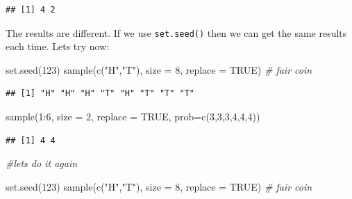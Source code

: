 \documentclass[
]{book}
\newenvironment{Shaded}{\begin{snugshade}}{\end{snugshade}}
\newcommand{\AttributeTok}[1]{\textcolor[rgb]{0.77,0.63,0.00}{#1}}
\newcommand{\CommentTok}[1]{\textcolor[rgb]{0.56,0.35,0.01}{\textit{#1}}}
\newcommand{\ConstantTok}[1]{\textcolor[rgb]{0.00,0.00,0.00}{#1}}
\newcommand{\DecValTok}[1]{\textcolor[rgb]{0.00,0.00,0.81}{#1}}
\newcommand{\FunctionTok}[1]{\textcolor[rgb]{0.00,0.00,0.00}{#1}}
\newcommand{\NormalTok}[1]{#1}
\newcommand{\SpecialCharTok}[1]{\textcolor[rgb]{0.00,0.00,0.00}{#1}}
\newcommand{\StringTok}[1]{\textcolor[rgb]{0.31,0.60,0.02}{#1}}
\theoremstyle{definition}
\theoremstyle{definition}
\theoremstyle{definition}
\theoremstyle{definition}
\theoremstyle{remark}
\begin{document}
\begin{verbatim}
## [1] 4 2
\end{verbatim}

The results are different. If we use \texttt{set.seed()} then we can get the same results each time. Lets try now:

\begin{Shaded}
\begin{Highlighting}[]
\FunctionTok{set.seed}\NormalTok{(}\DecValTok{123}\NormalTok{)}
\FunctionTok{sample}\NormalTok{(}\FunctionTok{c}\NormalTok{(}\StringTok{"H"}\NormalTok{,}\StringTok{"T"}\NormalTok{), }\AttributeTok{size =} \DecValTok{8}\NormalTok{, }\AttributeTok{replace =} \ConstantTok{TRUE}\NormalTok{)  }\CommentTok{\# fair coin}
\end{Highlighting}
\end{Shaded}

\begin{verbatim}
## [1] "H" "H" "H" "T" "H" "T" "T" "T"
\end{verbatim}

\begin{Shaded}
\begin{Highlighting}[]
\FunctionTok{sample}\NormalTok{(}\DecValTok{1}\SpecialCharTok{:}\DecValTok{6}\NormalTok{, }\AttributeTok{size =} \DecValTok{2}\NormalTok{, }\AttributeTok{replace =} \ConstantTok{TRUE}\NormalTok{, }\AttributeTok{prob=}\FunctionTok{c}\NormalTok{(}\DecValTok{3}\NormalTok{,}\DecValTok{3}\NormalTok{,}\DecValTok{3}\NormalTok{,}\DecValTok{4}\NormalTok{,}\DecValTok{4}\NormalTok{,}\DecValTok{4}\NormalTok{))}
\end{Highlighting}
\end{Shaded}

\begin{verbatim}
## [1] 4 4
\end{verbatim}

\begin{Shaded}
\begin{Highlighting}[]
\CommentTok{\#let\textquotesingle{}s do it again}

\FunctionTok{set.seed}\NormalTok{(}\DecValTok{123}\NormalTok{)}
\FunctionTok{sample}\NormalTok{(}\FunctionTok{c}\NormalTok{(}\StringTok{"H"}\NormalTok{,}\StringTok{"T"}\NormalTok{), }\AttributeTok{size =} \DecValTok{8}\NormalTok{, }\AttributeTok{replace =} \ConstantTok{TRUE}\NormalTok{)  }\CommentTok{\# fair coin}
\end{Highlighting}
\end{Shaded}
\end{document}
